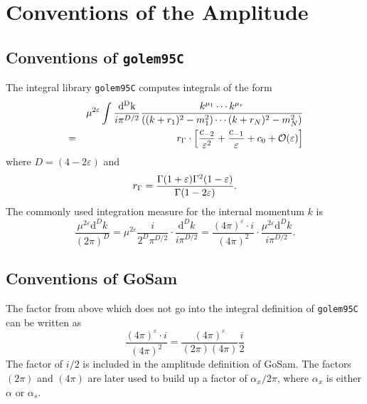 \documentclass[11pt,a4paper]{refrep}
\newcommand{\gosamversion}{{2{.}0}}
\newcommand{\gosamv}[1][\gosamversion]{{\sc GoSam}\xspace}
\newcommand{\golemVC}{{\tt golem95C}\xspace}
\newcommand{\diff}[1][{}]{{\mathrm{d}}^{#1}\!}
\newcommand{\nn}{\nonumber}
\begin{document}
\appendix

\chapter{Conventions of the Amplitude}

\section{Conventions of \golemVC}
The integral library \golemVC{} computes integrals of the form
\begin{eqnarray}
&&\mu^{2\varepsilon}\int\frac{\mathrm{d^D k}}{i\pi^{D/2}}\frac{k^{\mu_1}\cdots k^{\mu_r}}{%
((k+r_1)^2-m_1^2)\cdots(k+r_N)^2-m_N^2)}\nn\\
&=&r_\Gamma\cdot\left[\frac{c_{-2}}{\varepsilon^2}+\frac{c_{-1}}{\varepsilon}+c_0
+{\mathcal{O}}(\varepsilon)\right]
\end{eqnarray}
where $D=(4-2\varepsilon)$ and
\begin{equation}
r_\Gamma=\frac{\Gamma(1+\varepsilon)\Gamma^2(1-\varepsilon)}{%
   \Gamma(1-2\varepsilon)}.
\end{equation}
The commonly used integration measure for the internal momentum $k$ is
\begin{equation}
\frac{\mu^{2\varepsilon}\diff[D]k}{(2\pi)^D}
=\mu^{2\varepsilon}\frac{i}{2^D\pi^{D/2}}\cdot\frac{{\mathrm d}^Dk}{i\pi^{D/2}}
=\frac{(4\pi)^\varepsilon \cdot i}{(4\pi)^2}\cdot%
 \frac{\mu^{2\varepsilon}{\mathrm d}^Dk}{i\pi^{D/2}}.
\end{equation}

\section{Conventions of \gosamv}
The factor from above which does not go into the integral definition of
\golemVC{} can be written as
\begin{equation}
\frac{(4\pi)^\varepsilon \cdot i}{(4\pi)^2}=
\frac{(4\pi)^\varepsilon}{(2\pi)(4\pi)}\frac{i}{2}
\end{equation}
The factor of $i/2$ is included in the amplitude definition of \gosamv{}.
The factors $(2\pi)$ and $(4\pi)$ are later used to build up a factor of
$\alpha_x/2\pi$, where $\alpha_x$ is either $\alpha$ or $\alpha_s$.
\end{document}

